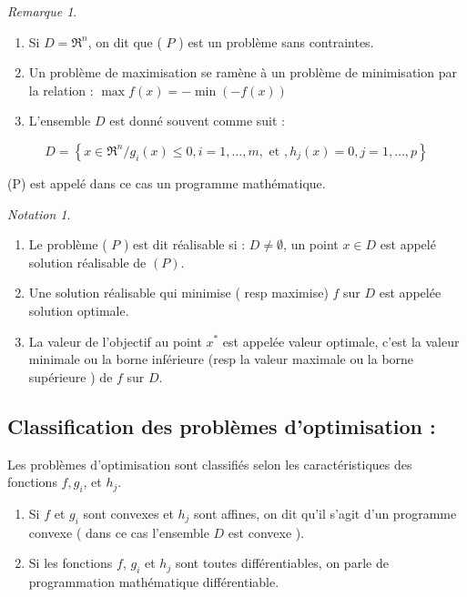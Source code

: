 \documentclass[a4paper,12pt,openany]{book}
\theoremstyle{plain}
\theoremstyle{definition}
\theoremstyle{remark}
\newtheorem{remark}[theorem]{Remarque}
\newtheorem{notation}[theorem]{Notation}
\theoremstyle{nbstyle}
\begin{document}
	\begin{remark}
		\begin{enumerate}
			\item Si $D=\Re^{n}$, on dit que ( $P$ ) est un problème sans contraintes.
			\item Un problème de maximisation se ramène à un problème de minimisation par la relation : $\max f(x)=-\displaystyle\min (-f(x))$
			\item L'ensemble $D$ est donné souvent comme suit :
		\end{enumerate}
		
		$$
		D=\left\{x \in \Re^{n} / g_{i}(x) \leq 0, i=1, \ldots, m, \text { et }, h_{j}(x)=0, j=1, \ldots, p\right\}
		$$
		
		(P) est appelé dans ce cas un programme mathématique.
	\end{remark}
	
	
	\begin{notation}
		\begin{enumerate}
			\item Le problème ( $P$ ) est dit réalisable si : $D \neq \emptyset$, un point $x \in D$ est appelé solution réalisable de $(P)$.
			\item Une solution réalisable qui minimise ( resp maximise) $f$ sur $D$ est appelée solution optimale.
			\item La valeur de l'objectif au point $x^{*}$ est appelée valeur optimale, c'est la valeur minimale ou la borne inférieure (resp la valeur maximale ou la borne supérieure ) de $f$ sur $D$.
		\end{enumerate}
	\end{notation}
	
	\subsection{Classification des problèmes d'optimisation :}
	Les problèmes d'optimisation sont classifiés selon les caractéristiques des fonctions $f, g_{i}$, et $h_{j}$.
	
	\begin{enumerate}
		\item Si $f$ et $g_{i}$ sont convexes et $h_{j}$ sont affines, on dit qu'il s'agit d'un programme convexe ( dans ce cas l'ensemble $D$ est convexe ).
		\item Si les fonctions $f$, $g_{i}$ et $h_{j}$ sont toutes différentiables, on parle de programmation mathématique différentiable.
	\end{enumerate}
	
\end{document}

